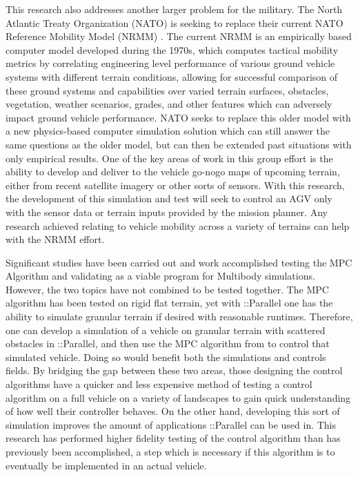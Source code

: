 \documentclass[12pt,onecolumn]{report}
\newcommand{\CHRONO}{{\sffamily{{Chrono}}}}
\newcommand{\ChronoParallel}{{\sffamily{Chrono}}::Parallel}
\begin{document}
This research also addresses another larger problem for the military. The North Atlantic Treaty Organization (NATO) is seeking to replace their current NATO Reference Mobility Model (NRMM) \cite{NATONRMM}. The current NRMM is an empirically based computer model developed during the 1970s, which computes tactical mobility metrics by correlating engineering level performance of various ground vehicle systems with different terrain conditions, allowing for successful comparison of these ground systems and capabilities over varied terrain surfaces, obstacles, vegetation, weather scenarios, grades, and other features which can adversely impact ground vehicle performance. NATO seeks to replace this older model with a new physics-based computer simulation solution which can still answer the same questions as the older model, but can then be extended past situations with only empirical results. One of the key areas of work in this group effort is the ability to develop and deliver to the vehicle go-nogo maps of upcoming terrain, either from recent satellite imagery or other sorts of sensors. With this research, the development of this simulation and test will seek to control an AGV only with the sensor data or terrain inputs provided by the mission planner. Any research achieved relating to vehicle mobility across a variety of terrains can help with the NRMM effort. 

Significant studies have been carried out and work accomplished testing the MPC Algorithm and validating {\CHRONO} as a viable program for Multibody simulations. However, the two topics have not combined to be tested together. The MPC algorithm has been tested on rigid flat terrain, yet with {\ChronoParallel} one has the ability to simulate granular terrain if desired with reasonable runtimes. Therefore, one can develop a simulation of a vehicle on granular terrain with scattered obstacles in {\ChronoParallel}, and then use the MPC algorithm from \cite{ModelFidelity2016} to control that simulated vehicle. Doing so would benefit both the simulations and controls fields. By bridging the gap between these two areas, those designing the control algorithms have a quicker and less expensive method of testing a control algorithm on a full vehicle on a variety of landscapes to gain quick understanding of how well their controller behaves. On the other hand, developing this sort of simulation improves the amount of applications {\ChronoParallel} can be used in. This research has performed higher fidelity testing of the control algorithm than has previously been accomplished, a step which is necessary if this algorithm is to eventually be implemented in an actual vehicle. 
\end{document}
